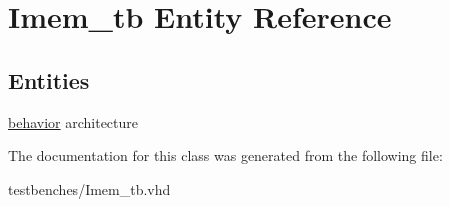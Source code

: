 \hypertarget{class_imem__tb}{\section{\-Imem\-\_\-tb \-Entity \-Reference}
\label{class_imem__tb}
}
\subsection*{\-Entities}
\begin{DoxyCompactItemize}
\item 
\hyperlink{class_imem__tb_1_1behavior}{behavior} architecture
\end{DoxyCompactItemize}


\-The documentation for this class was generated from the following file\-:\begin{DoxyCompactItemize}
\item 
testbenches/\-Imem\-\_\-tb.\-vhd\end{DoxyCompactItemize}
